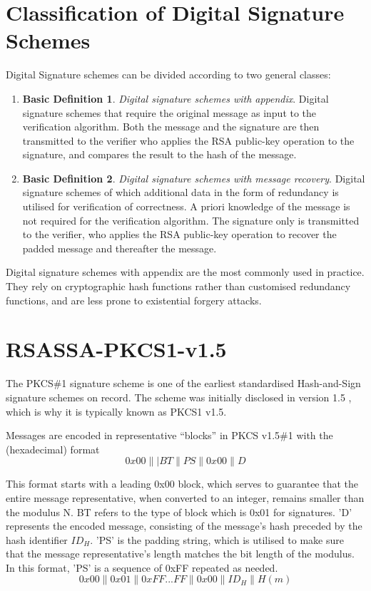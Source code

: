 \documentclass[]{final_report}
\theoremstyle{definition}
\newtheorem{basic}{Basic Definition}
\begin{document}
\section{Classification of Digital Signature Schemes}
Digital Signature schemes can be divided according to two general classes:
\begin{enumerate}
    \item[] \begin{basic} 
\textit{Digital signature schemes with appendix}. Digital signature schemes that require the original message as input to the verification algorithm. Both the message and the signature are then transmitted to the verifier who applies the RSA public-key operation to the signature, and compares the result to the hash of the message.
\end{basic}
    \item[] \begin{basic}
\textit{Digital signature schemes with message recovery}. Digital signature schemes of which additional data in the form of redundancy is utilised for verification of correctness. A priori knowledge of the message is not required for the verification algorithm. The signature only is transmitted to the verifier, who applies the RSA public-key operation to recover the padded message and thereafter the message. 
\end{basic}

\end{enumerate}

Digital signature schemes with appendix are the most commonly used in practice. They rely on cryptographic hash functions rather than customised redundancy functions, and are less prone to existential forgery attacks.


\section{RSASSA-PKCS1-v1.5}
The PKCS\#1 signature scheme is one of the earliest standardised Hash-and-Sign signature schemes on record. The scheme was initially disclosed in version 1.5 \cite{rfc2313}, which is why it is typically known as PKCS1 v1.5.

Messages are encoded in representative “blocks” in PKCS v1.5\#1 with the (hexadecimal) format
\[0x00\||BT\|PS\|0x00\|D\]

This format starts with a leading 0x00 block, which serves to guarantee that the entire message representative, when converted to an integer, remains smaller than the modulus N. BT refers to the type of block which is 0x01 for signatures. 'D' represents the encoded message, consisting of the message's hash preceded by the hash identifier $ID_{H}$. 'PS' is the padding string, which is utilised to make sure that the message representative's length matches the bit length of the modulus. In this format, 'PS' is a sequence of 0xFF repeated as needed.
\[0x00\|0x01\|0xFF . . . FF\|0x00\|ID_{H}\|H(m)\]
\end{document}

